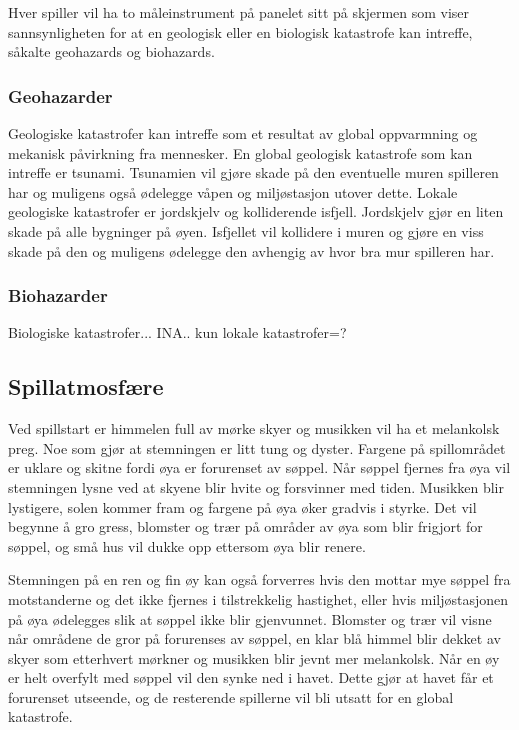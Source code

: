 Hver spiller vil ha to måleinstrument på panelet sitt på skjermen som viser sannsynligheten for at en geologisk eller en biologisk katastrofe kan intreffe, såkalte geohazards og biohazards.

\subsubsection{Geohazarder}
Geologiske katastrofer kan intreffe som et resultat av global oppvarmning og mekanisk påvirkning fra mennesker.
En global geologisk katastrofe som kan intreffe er tsunami. Tsunamien vil gjøre skade på den eventuelle muren spilleren har og muligens også ødelegge våpen og miljøstasjon utover dette.
Lokale geologiske katastrofer er jordskjelv og kolliderende isfjell. Jordskjelv gjør en liten skade på alle bygninger på øyen. Isfjellet vil kollidere i muren og gjøre en viss skade på den og muligens ødelegge den avhengig av hvor bra mur spilleren har. 


\subsubsection{Biohazarder}
Biologiske katastrofer... INA.. kun lokale katastrofer=?


\subsection{Spillatmosfære}

Ved spillstart er himmelen full av mørke skyer og musikken vil ha et melankolsk preg. Noe som gjør 
 at stemningen er litt tung og dyster. Fargene på spillområdet er uklare og skitne fordi øya er forurenset av søppel.
Når søppel fjernes fra øya vil stemningen lysne ved at skyene blir hvite og forsvinner med tiden. Musikken blir lystigere, 
solen kommer fram og fargene på øya øker gradvis i styrke. Det vil begynne å gro gress, blomster og 
trær på områder av øya som blir frigjort for søppel, og små hus vil dukke opp ettersom øya blir renere. 

Stemningen på en ren og fin øy kan også forverres hvis den mottar mye søppel fra motstanderne og det ikke fjernes i tilstrekkelig hastighet,
eller hvis miljøstasjonen på øya ødelegges slik at søppel ikke blir gjenvunnet.
Blomster og trær vil visne når områdene de gror på forurenses av søppel, en klar blå himmel blir dekket av skyer som etterhvert mørkner og
musikken blir jevnt mer melankolsk. 
Når en øy er helt overfylt med søppel vil den synke ned i havet. Dette gjør at havet  får et forurenset utseende,
 og de resterende spillerne vil bli utsatt for en global katastrofe.


